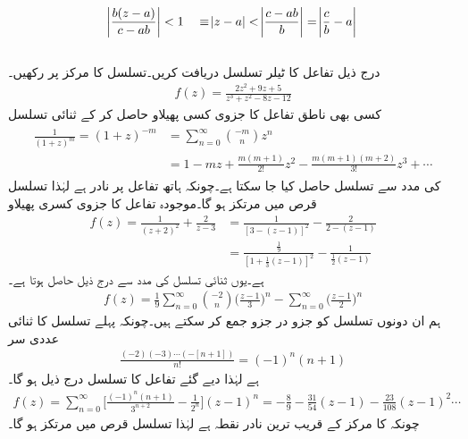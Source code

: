 \begin{align*}
\abs{\frac{b(z-a)}{c-ab}}<1 \quad \equiv \abs{z-a}<\abs{\frac{c-ab}{b}}=\abs{\frac{c}{b}-a}
\end{align*}
\quad {}\\
درج ذیل تفاعل کا ٹیلر تسلسل دریافت کریں۔تسلسل کا مرکز  پر رکھیں۔
\begin{align*}
f(z)=\frac{2z^2+9z+5}{z^3+z^2-8z-12}
\end{align*}
کسی بھی ناطق تفاعل کا جزوی کسی پھیلاو حاصل کر کے ثنائی تسلسل
\begin{gather}
\begin{aligned}\label{مساوات_ٹیلر_عملی_تراکیب_ب}
\frac{1}{(1+z)^m}=(1+z)^{-m}&=\sum\limits_{n=0}^{\infty} \binom{-m}{n} z^n\\
&=1-mz+\frac{m(m+1)}{2!}z^2-\frac{m(m+1)(m+2)}{3!}z^3+\cdots
\end{aligned}
\end{gather} 
کی مدد سے تسلسل حاصل کیا جا سکتا ہے۔چونکہ ہاتھ تفاعل  پر نادر ہے لہٰذا تسلسل قرص  میں مرتکز ہو گا۔موجودہ تفاعل کا جزوی کسری پھیلاو
\begin{align*}
f(z)=\frac{1}{(z+2)^2}+\frac{2}{z-3}&=\frac{1}{[3-(z-1)]^2}-\frac{2}{2-(z-1)}\\
&=\frac{\frac{1}{9}}{[1+\frac{1}{3}(z-1)]^2}-\frac{1}{\frac{1}{2}(z-1)}
\end{align*}
ہے۔یوں ثنائی تسلسل کی مدد سے درج ذیل حاصل ہوتا ہے۔
\begin{align*}
f(z)=\frac{1}{9}\sum\limits_{n=0}^{\infty} \binom{-2}{n} \big(\frac{z-1}{3}\big)^n-\sum\limits_{n=0}^{\infty}\big(\frac{z-1}{2}\big)^n
\end{align*} 
ہم ان دونوں تسلسل کو جزو در جزو جمع کر سکتے ہیں۔چونکہ پہلے تسلسل کا ثنائی عددی سر 
\begin{align*}
\tfrac{(-2)(-3)\cdots(-[n+1])}{n!}=(-1)^n(n+1)
\end{align*}
ہے لہٰذا دیے گئے تفاعل کا تسلسل درج ذیل ہو گا۔
\begin{align*}
f(z)=\sum\limits_{n=0}^{\infty}\big[\frac{(-1)^n(n+1)}{3^{n+2}}-\frac{1}{2^n}\big](z-1)^n=-\frac{8}{9}-\frac{31}{54}(z-1)-\frac{23}{108}(z-1)^2\cdots
\end{align*}
چونکہ   کا  مرکز  کے قریب ترین نادر نقطہ  ہے لہٰذا تسلسل قرص  میں مرتکز ہو گا۔
\quad {}\\
